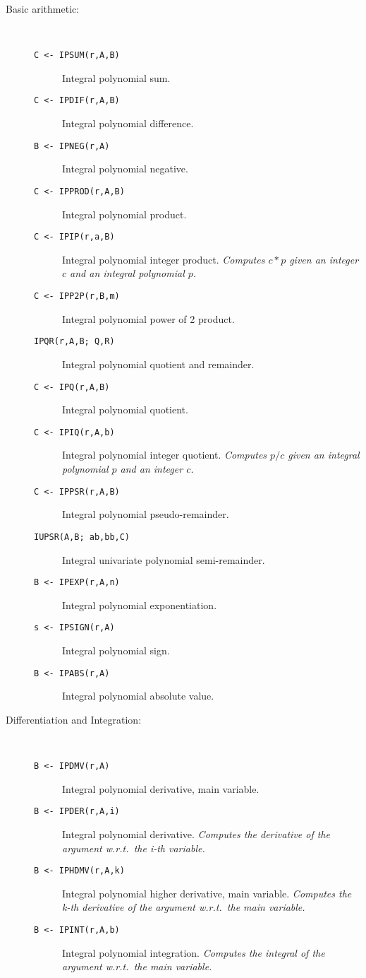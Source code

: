 \begin{description}
\item[Basic arithmetic:] \ \
  \begin{description}
  \item[{\tt C <- IPSUM(r,A,B) 
}]  Integral polynomial sum.
  \item[{\tt C <- IPDIF(r,A,B) 
}]  Integral polynomial difference.
  \item[{\tt B <- IPNEG(r,A) 
}]  Integral polynomial negative.
  \item[{\tt C <- IPPROD(r,A,B) 
}]  Integral polynomial product.
  \item[{\tt C <- IPIP(r,a,B) 
}]  Integral polynomial integer product. {\em Computes $c * p$
    given an integer $c$ and an integral polynomial $p$.}
  \item[{\tt C <- IPP2P(r,B,m) 
}]  Integral polynomial power of 2 product.
  \item[{\tt  IPQR(r,A,B; Q,R) 
}]  Integral polynomial quotient and remainder.
  \item[{\tt C <- IPQ(r,A,B) 
}]  Integral polynomial quotient.
  \item[{\tt C <- IPIQ(r,A,b) 
}]  Integral polynomial integer quotient. {\em Computes $p/c$
    given an integral polynomial $p$ and an integer $c$.}
  \item[{\tt C <- IPPSR(r,A,B) 
}]  Integral polynomial pseudo-remainder.
  \item[{\tt  IUPSR(A,B; ab,bb,C) 
}]  Integral univariate polynomial semi-remainder.
  \item[{\tt B <- IPEXP(r,A,n) 
}]  Integral polynomial exponentiation.
  \item[{\tt s <- IPSIGN(r,A) 
}]  Integral polynomial sign.
  \item[{\tt B <- IPABS(r,A) 
}]  Integral polynomial absolute value.

  \end{description}

\item[Differentiation and Integration:] \ \
  \begin{description}
  \item[{\tt B <- IPDMV(r,A) 
}]  Integral polynomial derivative, main variable.
  \item[{\tt B <- IPDER(r,A,i) 
}]\index{IPDER}  Integral polynomial derivative. {\em Computes the
    derivative of the argument w.r.t.\ the i-th variable.}
  \item[{\tt B <- IPHDMV(r,A,k) 
}]\index{IPHDMV}  Integral polynomial higher derivative, main variable. {\em
    Computes the k-th derivative of the argument w.r.t.\ the main
    variable.}
  \item[{\tt B <- IPINT(r,A,b) 
}]  Integral polynomial integration. {\em Computes the integral
    of the argument w.r.t.\ the main variable.}


\end{description}
\end{description}

